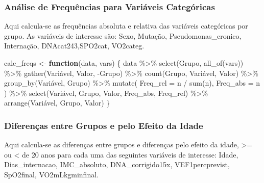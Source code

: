 \documentclass[
]{article}
\newenvironment{Shaded}{\begin{snugshade}}{\end{snugshade}}
\newcommand{\AttributeTok}[1]{\textcolor[rgb]{0.77,0.63,0.00}{#1}}
\newcommand{\ControlFlowTok}[1]{\textcolor[rgb]{0.13,0.29,0.53}{\textbf{#1}}}
\newcommand{\FunctionTok}[1]{\textcolor[rgb]{0.00,0.00,0.00}{#1}}
\newcommand{\NormalTok}[1]{#1}
\newcommand{\OtherTok}[1]{\textcolor[rgb]{0.56,0.35,0.01}{#1}}
\newcommand{\SpecialCharTok}[1]{\textcolor[rgb]{0.00,0.00,0.00}{#1}}
\begin{document}
\hypertarget{anuxe1lise-de-frequuxeancias-para-variuxe1veis-categuxf3ricas}{%
\subsubsection{Análise de Frequências para Variáveis
Categóricas}\label{anuxe1lise-de-frequuxeancias-para-variuxe1veis-categuxf3ricas}}

Aqui calcula-se as frequências absoluta e relativa das variáveis
categóricas por grupo. As variáveis de interesse são: Sexo, Mutação,
Pseudomonas\_cronico, Internação, DNAcat243,SPO2cat, VO2categ.

\begin{Shaded}
\begin{Highlighting}[]
\NormalTok{calc\_freqs }\OtherTok{\textless{}{-}} \ControlFlowTok{function}\NormalTok{(data, vars) \{}
\NormalTok{    data }\SpecialCharTok{\%\textgreater{}\%}
        \FunctionTok{select}\NormalTok{(Grupo, }\FunctionTok{all\_of}\NormalTok{(vars)) }\SpecialCharTok{\%\textgreater{}\%}
        \FunctionTok{gather}\NormalTok{(Variável, Valor, }\SpecialCharTok{{-}}\NormalTok{Grupo) }\SpecialCharTok{\%\textgreater{}\%}
        \FunctionTok{count}\NormalTok{(Grupo, Variável, Valor) }\SpecialCharTok{\%\textgreater{}\%}
        \FunctionTok{group\_by}\NormalTok{(Variável, Grupo) }\SpecialCharTok{\%\textgreater{}\%}
        \FunctionTok{mutate}\NormalTok{(}
            \AttributeTok{Freq\_rel =}\NormalTok{ n }\SpecialCharTok{/} \FunctionTok{sum}\NormalTok{(n),}
            \AttributeTok{Freq\_abs =}\NormalTok{ n}
\NormalTok{        ) }\SpecialCharTok{\%\textgreater{}\%}
        \FunctionTok{select}\NormalTok{(Variável, Grupo, Valor, Freq\_abs, Freq\_rel) }\SpecialCharTok{\%\textgreater{}\%}
        \FunctionTok{arrange}\NormalTok{(Variável, Grupo, Valor)}
\NormalTok{\}}
\end{Highlighting}
\end{Shaded}

\hypertarget{diferenuxe7as-entre-grupos-e-pelo-efeito-da-idade}{%
\subsubsection{Diferenças entre Grupos e pelo Efeito da
Idade}\label{diferenuxe7as-entre-grupos-e-pelo-efeito-da-idade}}

Aqui calcula-se as diferenças entre grupos e diferenças pelo efeito da
idade, \textgreater= ou \textless{} de 20 anos para cada uma das
seguintes variáveis de interesse: Idade, Dias\_internacao,
IMC\_absoluto, DNA\_corrigido15x, VEF1percprevist, SpO2final,
VO2mLkgminfinal.
\end{document}
